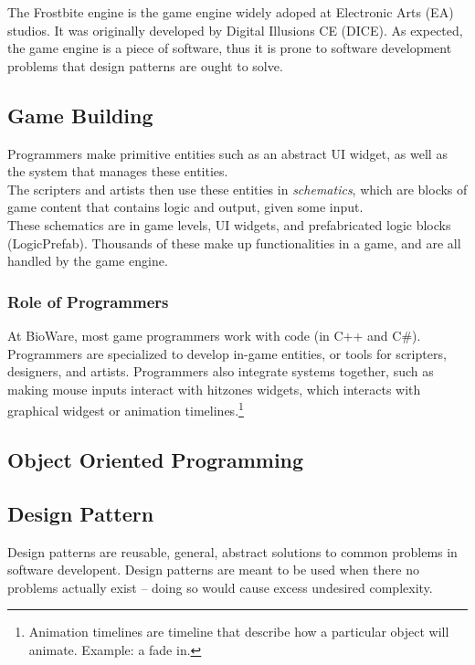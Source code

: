 \documentclass[10pt,letterpaper]{article}
\newcommand{\bs}{\bigskip}
\begin{document}
\begin{multicols}{2}
The Frostbite engine is the game engine widely adoped at Electronic Arts (EA) studios. It was originally developed by Digital Illusions CE (DICE).\cite{frostbite}\cite{frostbite-wiki} As expected, the game engine is a piece of software, thus it is prone to software development problems that design patterns are ought to solve.

\subsection{Game Building}

Programmers make primitive entities such as an abstract UI widget, as well as the system that manages these entities.\bs
\\
The scripters and artists then use these entities in \textit{schematics}, which are blocks of game content that contains logic and output, given some input.\bs
\\
These schematics are in game levels, UI widgets, and prefabricated logic blocks (LogicPrefab). Thousands of these make up functionalities in a game, and are all handled by the game engine.


\subsubsection{Role of Programmers}

At BioWare, most game programmers work with code (in C++ and C\#). Programmers are specialized to develop in-game entities, or tools for scripters, designers, and artists. Programmers also integrate systems together, such as making mouse inputs interact with hitzones widgets, which interacts with graphical widgest or animation timelines.\footnote{Animation timelines are timeline that describe how a particular object will animate. Example: a fade in.}

\subsection{Object Oriented Programming}

\subsection{Design Pattern}

Design patterns are reusable, general, abstract solutions to common problems in software developent.\cite{sm-designpatterns} Design patterns are meant to be used when there no problems actually exist -- doing so would cause excess undesired complexity.


\end{multicols}
\end{document}
